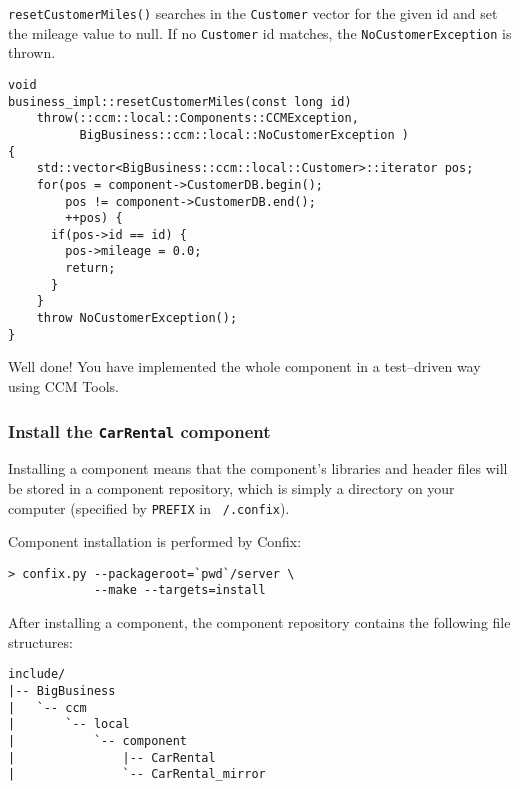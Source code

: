 {\tt resetCustomerMiles()} searches in the {\tt Customer}
vector for the given id and set the mileage value to null.
If no {\tt Customer} id matches, the {\tt NoCustomerException} is thrown.

\begin{small}
\begin{verbatim}
void
business_impl::resetCustomerMiles(const long id)
    throw(::ccm::local::Components::CCMException,
          BigBusiness::ccm::local::NoCustomerException )
{
    std::vector<BigBusiness::ccm::local::Customer>::iterator pos;
    for(pos = component->CustomerDB.begin(); 
        pos != component->CustomerDB.end(); 
        ++pos) {
      if(pos->id == id) {
        pos->mileage = 0.0;
        return;
      }
    }
    throw NoCustomerException();
}
\end{verbatim}
\end{small}

Well done! You have implemented the whole component in a test--driven
way using CCM Tools.



\newpage
\subsubsection{Install the {\tt CarRental} component}

Installing a component means that the component's libraries and header files 
will be stored in a component repository, which is simply a directory on your 
computer (specified by {\tt PREFIX} in {\tt ~/.confix}).

Component installation is performed by Confix:
\begin{small}
\begin{verbatim}
> confix.py --packageroot=`pwd`/server \
            --make --targets=install
\end{verbatim}
\end{small}


After installing a component, the component repository contains the following
file structures:
\begin{small}
\begin{verbatim}
include/
|-- BigBusiness
|   `-- ccm
|       `-- local
|           `-- component
|               |-- CarRental
|               `-- CarRental_mirror
\end{verbatim}
\end{small}

